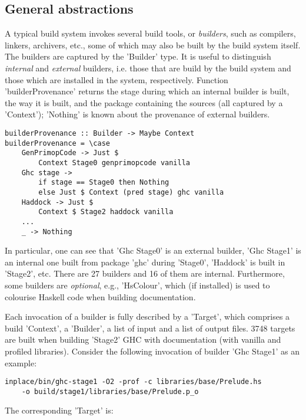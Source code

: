\subsection{General abstractions}

A typical build system invokes several build tools, or \emph{builders}, such as
compilers, linkers, archivers, etc., some of which may also be built by the
build system itself. The builders are captured by the \lst'Builder' type. It
is useful to distinguish \emph{internal} and \emph{external} builders, i.e.
those that are build by the build system and those which are installed in the
system, respectively. Function \lst'builderProvenance' returns the stage
during which an internal builder is built, the way it is built, and the package
containing the sources (all captured by a \lst'Context'); \lst'Nothing' is
known about the provenance of external builders.

\begin{lstlisting}
builderProvenance :: Builder -> Maybe Context
builderProvenance = \case
    GenPrimopCode -> Just $
        Context Stage0 genprimopcode vanilla
    Ghc stage ->
        if stage == Stage0 then Nothing
        else Just $ Context (pred stage) ghc vanilla
    Haddock -> Just $
        Context $ Stage2 haddock vanilla
    ...
    _ -> Nothing
\end{lstlisting}

In particular, one can see that \lst'Ghc Stage0' is an external builder,
\lst'Ghc Stage1' is an internal one built from package \lst'ghc'
during \lst'Stage0', \lst'Haddock' is built in \lst'Stage2', etc. There are
27 builders and 16 of them are internal. Furthermore, some builders are
\emph{optional}, e.g., \lst'HsColour', which (if installed) is used to
colourise Haskell code when building documentation.

Each invocation of a builder is fully described by a \lst'Target', which
comprises a build \lst'Context', a \lst'Builder', a list of input and
a list of output files. 3748 targets are built when building \lst'Stage2' GHC
with documentation (with vanilla and profiled libraries). Consider the following
invocation of builder \lst'Ghc Stage1' as an example:

\begin{lstlisting}
inplace/bin/ghc-stage1 -O2 -prof -c libraries/base/Prelude.hs
    -o build/stage1/libraries/base/Prelude.p_o
\end{lstlisting}

\noindent The corresponding \lst'Target' is:

